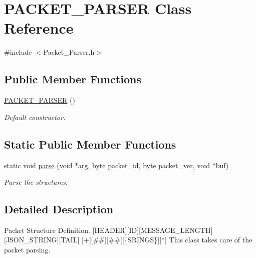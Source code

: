 \hypertarget{class_p_a_c_k_e_t___p_a_r_s_e_r}{\section{P\-A\-C\-K\-E\-T\-\_\-\-P\-A\-R\-S\-E\-R Class Reference}
\label{class_p_a_c_k_e_t___p_a_r_s_e_r}
}


{\ttfamily \#include $<$Packet\-\_\-\-Parser.\-h$>$}

\subsection*{Public Member Functions}
\begin{DoxyCompactItemize}
\item 
\hyperlink{class_p_a_c_k_e_t___p_a_r_s_e_r_ab191287423bf6310de899635bef9cef7}{P\-A\-C\-K\-E\-T\-\_\-\-P\-A\-R\-S\-E\-R} ()
\begin{DoxyCompactList}\small\item\em Default constructor. \end{DoxyCompactList}\end{DoxyCompactItemize}
\subsection*{Static Public Member Functions}
\begin{DoxyCompactItemize}
\item 
static void \hyperlink{class_p_a_c_k_e_t___p_a_r_s_e_r_adff234e2a9326553b7eb5b63a42724aa}{parse} (void $\ast$arg, byte packet\-\_\-id, byte packet\-\_\-ver, void $\ast$buf)
\begin{DoxyCompactList}\small\item\em Parse the structures. \end{DoxyCompactList}\end{DoxyCompactItemize}


\subsection{Detailed Description}
Packet Structure Definition. \mbox{[}H\-E\-A\-D\-E\-R\mbox{]}\mbox{[}I\-D\mbox{]}\mbox{[}M\-E\-S\-S\-A\-G\-E\-\_\-\-L\-E\-N\-G\-T\-H\mbox{]}\mbox{[}J\-S\-O\-N\-\_\-\-S\-T\-R\-I\-N\-G\mbox{]}\mbox{[}T\-A\-I\-L\mbox{]} \mbox{[}+\mbox{]}\mbox{[}\#\#\mbox{]}\mbox{[}\#\#\mbox{]}\mbox{[}\{S\-R\-I\-N\-G\-S\}\mbox{]}\mbox{[}$\ast$\mbox{]} This class takes care of the packet parsing. 

